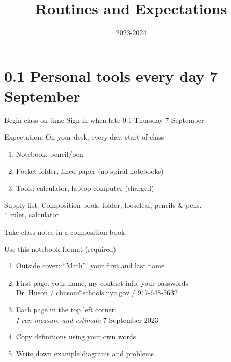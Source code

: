 \documentclass[onlytextwidth]{beamer}
\title{Routines and Expectations}
\date{2023-2024}
\begin{document}
\frame{\titlepage}


\section{0.1 Personal tools every day \hfill 7 September}
\begin{frame}{Begin class on time}
  {Sign in when late \hfill \alert{0.1 Thursday 7 September}}
  \begin{block}{Expectation: On your desk, every day, start of class}
  \begin{enumerate}
      \item Notebook, pencil/pen
      \item Pocket folder, lined paper (no spiral notebooks)
      \item Tools: calculator, laptop computer (charged)
  \end{enumerate}
  \end{block}
  Supply list: Composition book, folder, looseleaf, pencils \& pens, \\*
  ruler, calculator
  \end{frame}

\begin{frame}{Take class notes in a composition book}
  \begin{block}{Use this notebook format (required)}
    \begin{enumerate}
      \item Outside cover: ``Math'', your first and last name
      \item First page: your name, my contact info, your passwords \\
      \qquad Dr. Huson / chuson@schools.nyc.gov / 917-648-5632 \vspace{0.25cm}
      \item Each page in the top left corner: \\
      \emph{I can measure and estimate} \hfill 7 September 2023 \vspace{0.25cm}
      \item Copy definitions using your own words
      \item Write down example diagrams and problems
    \end{enumerate}
    \end{block}
  \end{frame}
\end{document}
